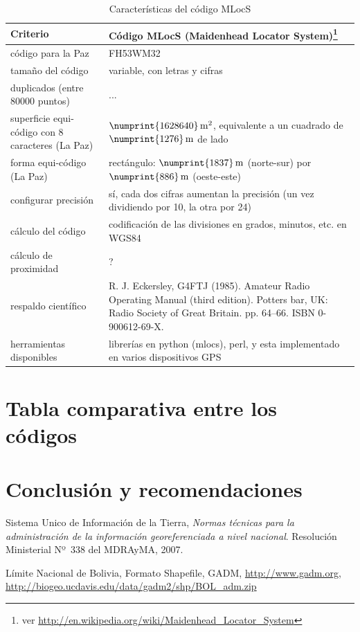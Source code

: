 \documentclass[letterpaper]{article}
\begin{document}
\begin{table}
	\centering
	\begin{tabu} to 
		\hline
		Criterio & Código MLocS (Maidenhead Locator System)\footnote{ver 
		\url{http://en.wikipedia.org/wiki/Maidenhead_Locator_System}} \\
		\hline
		código para la Paz & FH53WM32 \\
		\hline
		tamaño del código & variable, con letras y cifras \\
		\hline
		duplicados (entre 80000 puntos) & ... \\
		\hline
		superficie equi-código con 8 caracteres (La Paz) & 
		\(\numprint{1628640}\,\mathrm{m^{2}}\), 
		equivalente a un cuadrado de \(\numprint{1276}\,\mathrm{m}\) de lado \\
		\hline
		forma equi-código (La Paz) & rectángulo: 
		\(\numprint{1837}\,\mathrm{m}\) (norte-sur) por 
		\(\numprint{886}\,\mathrm{m}\) (oeste-este) \\
		\hline
		configurar precisión & sí, cada dos 
		cifras aumentan la precisión (un vez dividiendo por 10, la 
		otra por 24) \\
		\hline
		cálculo del código & codificación de las divisiones en grados, 
		minutos, etc. en WGS84 \\
		\hline
		cálculo de proximidad & ? \\
		\hline
		respaldo científico & R. J. Eckersley, G4FTJ (1985). Amateur Radio Operating Manual (third edition). Potters bar, UK: Radio Society of Great Britain. pp. 64–66. ISBN 0-900612-69-X. \\
		\hline
		herramientas disponibles & librerías en python (mlocs), perl, 
		y esta implementado en varios dispositivos GPS \\
		\hline
	\end{tabu}
	\caption{Características del código MLocS}
	\label{tab:carac_mlocs}
\end{table}

\section{Tabla comparativa entre los códigos}



\section{Conclusión y recomendaciones}

\begin{thebibliography}{99}

  Sistema Unico de Información de la Tierra,
  \emph{Normas técnicas para la administración de la información georeferenciada a nivel nacional}.
  Resolución Ministerial Nº~338 del MDRAyMA,
  2007.

  Límite Nacional de Bolivia,
  Formato Shapefile,
  GADM,
  \url{http://www.gadm.org},
  \url{http://biogeo.ucdavis.edu/data/gadm2/shp/BOL_adm.zip}

\end{thebibliography}
\end{document}
